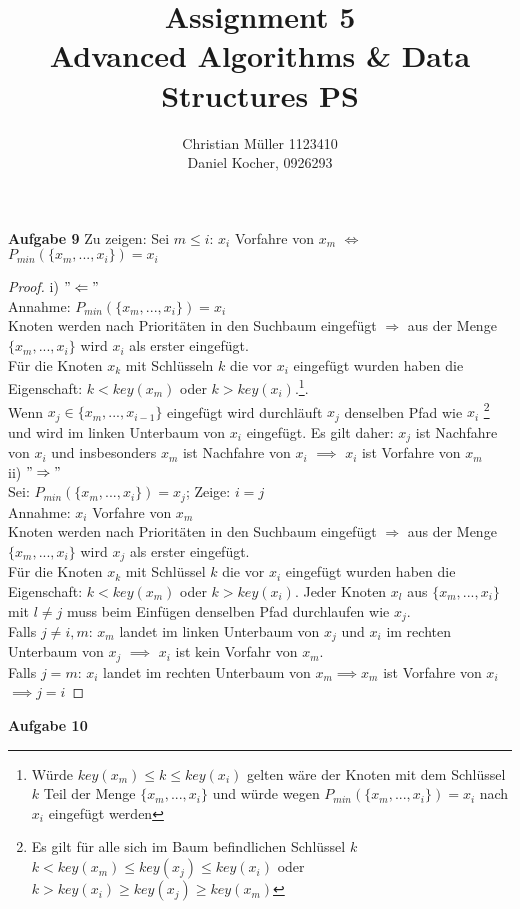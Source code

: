 \documentclass{article}
\begin{document}
\title{Assignment 5 \\ Advanced Algorithms \& Data Structures PS}%
\author{Christian Müller 1123410 \\ Daniel Kocher, 0926293}%
\maketitle

{\noindent\bfseries Aufgabe 9}%
\medskip%
 Zu zeigen: Sei $m \leq i$: $x_{i}$ Vorfahre von $x_{m}$ $\Leftrightarrow$ $P_{min}(\lbrace x_{m},...,x_{i} \rbrace)=x_{i}$ \\
\begin{proof}
\noindent

i) $"\Leftarrow"$\\
Annahme: $P_{min}(\lbrace x_{m},...,x_{i} \rbrace)=x_{i}$\\
Knoten werden nach Prioritäten in den Suchbaum eingefügt $\Rightarrow$ aus der Menge $\lbrace x_{m},...,x_{i} \rbrace$ wird $x_{i}$ als erster eingefügt.\\
Für die Knoten $x_{k}$ mit Schlüsseln $k$ die vor $x_{i}$ eingefügt wurden haben die Eigenschaft: $k < key(x_{m})$ oder $k > key(x_{i})$.\footnote[1]{Würde $key(x_{m}) \leq k \leq key(x_{i})$ gelten wäre der Knoten mit dem Schlüssel $k$ Teil der Menge $\lbrace x_{m},...,x_{i} \rbrace$ und würde wegen $P_{min}(\lbrace x_{m},...,x_{i} \rbrace)=x_{i}$ nach $x_{i}$ eingefügt werden}.\\
Wenn $x_{j} \in \lbrace x_{m},...,x_{i-1} \rbrace$ eingefügt wird durchläuft $x_{j}$ denselben Pfad wie $x_{i}$ \footnote[2]{Es gilt für alle sich im Baum befindlichen Schlüssel $k$ 
$k < key(x_{m}) \leq key(x_{j}) \leq key(x_{i})$  oder $k > key(x_{i}) \geq key(x_{j}) \geq key(x_{m})$ } und wird im linken Unterbaum von $x_{i}$ eingefügt. 
Es gilt daher: $x_{j}$ ist Nachfahre von $x_{i}$ und insbesonders $x_{m}$ ist Nachfahre von $x_{i}$ $\implies$ $x_{i}$ ist Vorfahre von $x_{m}$\\

ii) $"\Rightarrow"$\\
Sei: $P_{min}(\lbrace x_{m},...,x_{i} \rbrace)=x_{j}$; Zeige: $i=j$\\
Annahme: $x_{i}$ Vorfahre von $x_{m}$\\
Knoten werden nach Prioritäten in den Suchbaum eingefügt $\Rightarrow$ aus der Menge $\lbrace x_{m},...,x_{i} \rbrace$ wird $x_{j}$ als erster eingefügt.\\
Für die Knoten $x_{k}$ mit Schlüssel $k$ die vor $x_{i}$ eingefügt wurden haben die Eigenschaft: $k < key(x_{m})$ oder $k > key(x_{i})$.
Jeder Knoten $x_{l}$ aus $\lbrace x_{m},...,x_{i} \rbrace$ mit $l \neq j$ muss beim Einfügen denselben Pfad durchlaufen wie $x_{j}$.\\
Falls $j \neq i,m$: $x_{m}$ landet im linken Unterbaum von $x_{j}$ und $x_{i}$ im rechten Unterbaum von $x_{j}$ $\implies$ $x_{i}$ ist kein Vorfahr von $x_{m}$.\\
Falls $j=m$: $x_{i}$ landet im rechten Unterbaum von $x_{m} \implies x_{m}$ ist Vorfahre von $x_{i}$\\
$\implies j=i$ 
\end{proof}
{\noindent\bfseries Aufgabe 10}%
\medskip%
\end{document}

